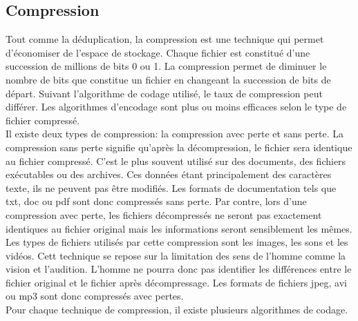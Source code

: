 \documentclass[a4paper,11pt]{report}
\begin{document}
	\subsection{Compression}
	Tout comme la déduplication, la compression est une technique qui permet d'économiser de l'espace de stockage. Chaque fichier est constitué d'une succession de millions de bits 0 ou 1. La compression permet de diminuer le nombre de bits que constitue un fichier en changeant la succession de bits de départ. Suivant l'algorithme de codage utilisé, le taux de compression peut différer. Les algorithmes d'encodage sont plus ou moins efficaces selon le type de fichier compressé.\\
 Il existe deux types de compression: la compression avec perte et sans perte. La compression sans perte signifie qu'après la décompression, le fichier sera identique au fichier compressé. C'est le plus souvent utilisé sur des documents, des fichiers exécutables ou des archives. Ces données étant principalement des caractères texte, ils ne peuvent pas être modifiés. Les formats de documentation tels que txt, doc ou pdf sont donc compressés sans perte.  Par contre, lors d'une compression avec perte, les fichiers décompressés ne seront pas exactement identiques au fichier original mais les informations seront sensiblement les mêmes. Les types de fichiers utilisés par cette compression sont les images, les sons et les vidéos. Cett technique se repose sur la limitation des sens de l'homme comme la vision et l'audition. L'homme ne pourra donc pas identifier les différences entre le fichier original et le fichier après décompressage. Les formats de fichiers jpeg, avi ou mp3 sont donc compressés avec pertes. \\
Pour chaque technique de compression, il existe plusieurs algorithmes de codage.\\
\end{document}
